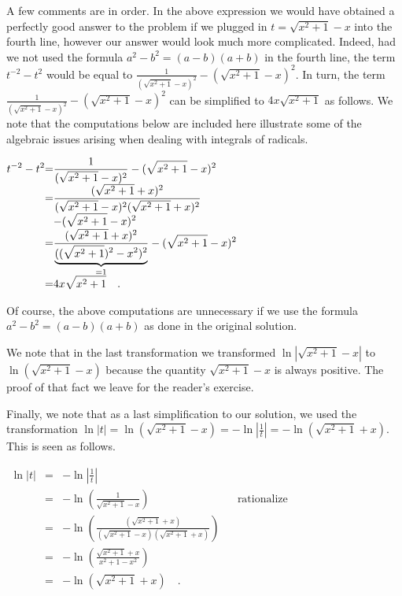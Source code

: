 {A few comments are in order. In the above expression we would have obtained a perfectly good answer to the problem if we plugged in $t=\sqrt{x^2+1}-x$ into the fourth line, however our answer would look much more complicated. Indeed, had we not used the formula $a^2-b^2=(a-b)(a+b)$ in the fourth line, the term $t^{-2}-t^{2}$ would be equal to $\frac{1}{(\sqrt{x^2+1}-x)^2}- (\sqrt{x^2+1}-x)^2$. In turn, the term $\frac{1}{(\sqrt{x^2+1}-x)^2}- (\sqrt{x^2+1}-x)^2$ can be simplified to $4x\sqrt{x^2+1}$ as follows. We note that the computations below are included here illustrate some of the algebraic issues arising when dealing with integrals of radicals.

\noindent$
\begin{array}{@{}r@{}c@{}l@{}}
\displaystyle t^{-2}-t^{2}&=&\displaystyle \frac{1}{(\sqrt{x^2+1}-x)^2}- (\sqrt{x^2+1}-x)^2\\
&=&\displaystyle
\frac{(\sqrt{x^2+1}+x)^2}{(\sqrt{x^2+1}-x)^2  (\sqrt{x^2+1}+x)^2 } \\
&&\displaystyle - (\sqrt{x^2+1}-x)^2 \\
&=&\displaystyle \frac{(\sqrt{x^2+1}+x)^2}{\underbrace{((\sqrt{x^2+1})^2-x^2)^2}_{=1} }- (\sqrt{x^2+1}-x)^2 \\
&=&\displaystyle 4x\sqrt{x^2+1}\quad .
\end{array}
$

Of course, the above computations are unnecessary if we use the formula $a^2-b^2=(a-b) (a+b)$ as done in the original solution. 

\noindent We note that in the last transformation we transformed $\ln \left| \sqrt{x^2+1}-x\right|$ to $\ln \left( \sqrt{ x^2+1}-x\right)$ because the quantity $\sqrt{x^2+1}-x$ is always positive. The proof of that fact we leave for the reader's exercise.

Finally, we note that as a last simplification to our solution, we used the transformation $\ln |t|= \ln \left( \sqrt{x^2+1} -x\right) = -\ln|\frac{1}{t}|= -\ln \left( \sqrt{x^2+1} +x \right)$. This is seen as follows.

\noindent $\begin{array}{rcll|l}
\displaystyle \ln |t|&=&\displaystyle  -\ln \left| \frac{1}{ t} \right| \\
&=&\displaystyle -\ln \left(\frac{1}{ \sqrt{x^2+1} - x} \right) && \text{rationalize}\\
&=&\displaystyle - \ln \left(\frac{ \left( \sqrt{x^2+1}+ x\right) }{\left( \sqrt{x^2+1} - x\right) \left(\sqrt{x^2+1 }+x\right) } \right)\\
&=& \displaystyle -\ln \left(\frac{\sqrt{x^2+1}+x}{x^2 +1 -x^2 }\right)\\
&=& \displaystyle  -\ln \left(\sqrt{x^2+1}+x\right)\quad .\\
\end{array}
$

}
